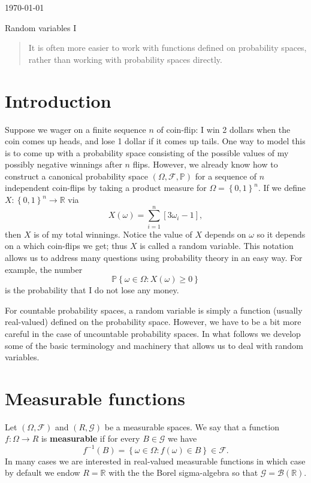 \documentclass[12pt, reqno]{amsart}
\newcommand\dff[1]{\textbf{#1}}
\newcommand\ns[1]{ \left\{ {#1} \right\} }
\renewcommand{\P}{{\mathbb P}}  %
\newcommand{\R}{{\mathbb R}}
\newcommand{\F}{{\mathcal F}}     %
\begin{document}
\today
\begin{title}
{Random variables I}
\end{title}
\maketitle{}

\begin{abstract}
It is often more easier to work with functions defined on probability spaces, rather than working with probability spaces directly.   
\end{abstract}


\section{Introduction}

Suppose we wager on a finite sequence $n$ of coin-flip:  I win 2 dollars when the coin comes up heads, and lose 1 dollar if it comes up tails.    One way to model this is to come up with a probability space consisting of the possible values of my possibly negative winnings after $n$ flips.   However, we already know how to construct a canonical probability space $(\Omega, \F, \P)$ for a sequence of $n$ independent coin-flips by taking a product measure for  $\Omega = \ns{0,1}^n$.  If we define $X: \ns{0,1}^n \to \R$ via
$$ X(\omega) = \sum_{i=1} ^n [3\omega_i-1],$$
then $X$ is of my total winnings.     Notice the value of $X$ depends on $\omega$ so it depends on a which coin-flips we get; thus $X$ is called a random variable.     This notation allows us to address many questions using probability theory  in an easy way.  For example, the number
$$ \P\ns{\omega \in \Omega:  X(\omega) \geq 0 }$$
is the probability that I do not lose any money.

For countable probability spaces, a random variable is simply a  function (usually real-valued) defined on the probability space.  However, we have to be a bit more careful in the case of uncountable probability spaces.  In what follows we develop some of the basic terminology and machinery that allows us to deal with random variables. 

\section{Measurable functions}

Let $(\Omega, \F)$ and $(R, \mathcal{G})$ be a measurable spaces.  We say that a function $f: \Omega \to R$ is \dff{measurable} if for every $B \in \mathcal{G}$ we have $$f^{-1}(B) = \ns{ \omega \in \Omega:  f(\omega) \in B}  \in \F.$$  In many cases we are interested in real-valued measurable functions in which case by default we endow $R=\R$ with the the Borel sigma-algebra so that $\mathcal{G} = \mathcal{B(\R)}$.  
\end{document}
